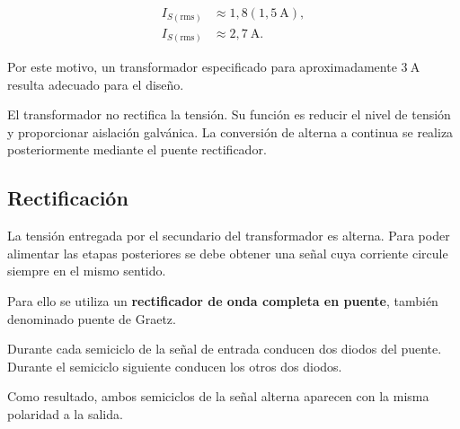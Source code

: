 \documentclass[12pt,a4paper]{article}
\begin{document}
	\begin{align}
		I_{S(\mathrm{rms})}
		&\approx
		1,8(1,5~\text{A}),
		\\
		I_{S(\mathrm{rms})}
		&\approx
		2,7~\text{A}.
	\end{align}
	
	Por este motivo, un transformador especificado para aproximadamente
	$3~\text{A}$ resulta adecuado para el diseño.
	
	\begin{tcolorbox}[
		colback=gray!5,
		colframe=black!50,
		title=Punto importante
		]
		El transformador no rectifica la tensión. Su función es reducir el nivel de
		tensión y proporcionar aislación galvánica. La conversión de alterna a continua
		se realiza posteriormente mediante el puente rectificador.
	\end{tcolorbox}
	
	\subsection{Rectificación}
	
	La tensión entregada por el secundario del transformador es alterna. Para poder
	alimentar las etapas posteriores se debe obtener una señal cuya corriente circule
	siempre en el mismo sentido.
	
	Para ello se utiliza un \textbf{rectificador de onda completa en puente},
	también denominado puente de Graetz.
	
	Durante cada semiciclo de la señal de entrada conducen dos diodos del puente.
	Durante el semiciclo siguiente conducen los otros dos diodos.
	
	Como resultado, ambos semiciclos de la señal alterna aparecen con la misma
	polaridad a la salida.
	
\end{document}
